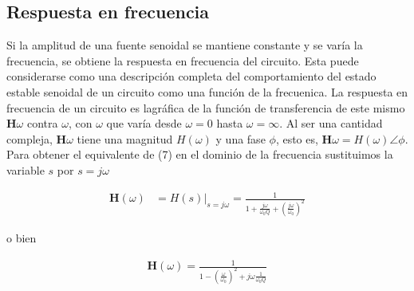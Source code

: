 \documentclass{article}
\begin{document}
\begin{figure}[H]
	\caption{}	
	\label{fig:figura2}
\end{figure}

\subsection{Respuesta en frecuencia}

Si la amplitud de una fuente senoidal se mantiene constante y se varía la frecuencia, se obtiene la respuesta en frecuencia del circuito. Esta puede considerarse como una descripción completa del comportamiento del estado estable senoidal de un circuito como una función de la frecuenica. La respuesta en frecuencia de un circuito es lagráfica de la función de transferencia de este mismo $\textbf{H}\omega$ contra $\omega$, con $\omega$ que varía desde $\omega=0$ hasta $\omega=\infty$. Al ser una cantidad compleja, $\textbf{H}\omega$ tiene una magnitud $H(\omega)$ y una fase $\phi$, esto es, $\textbf{H}\omega = H(\omega) \angle \phi $. \\


Para obtener el equivalente de (7) en el dominio de la frecuencia sustituimos la variable $s$ por $s=j\omega$ 

\begin{align}
	\textbf{H}(\omega) &= H(s)|_{s=j\omega}  = \frac{1}{1 + \frac{j\omega}{\omega_0 Q} + \left( \frac{j \omega}{\omega_0} \right)^2}
\end{align}

o bien

\begin{align}
	\textbf{H}(\omega) = \frac{1}{1 - \left( \frac{\omega}{\omega_0} \right)^2 + j\omega \frac{1}{\omega_0 Q}  }
\end{align}
\end{document}
